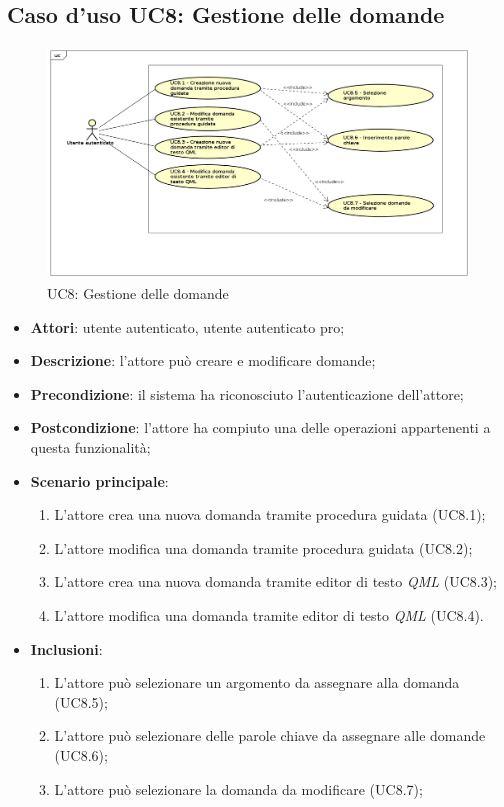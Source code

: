 \newpage
\subsection{Caso d'uso UC8: Gestione delle domande}
	\label{UC8}
	\begin{figure}[ht]
		\centering
			\includegraphics[scale=0.45,keepaspectratio]{UML/UC8.png}
		\caption{UC8: Gestione delle domande}
	\end{figure}
	\FloatBarrier
	\begin{itemize}
		\item
			\textbf{Attori}: utente autenticato, utente autenticato pro;
		\item		
			\textbf{Descrizione}: l'attore può creare e modificare domande;
		\item
			\textbf{Precondizione}: il sistema ha riconosciuto l'autenticazione dell'attore; 
		\item
			\textbf{Postcondizione}: l'attore ha compiuto una delle operazioni appartenenti a questa funzionalità;
		\item
			\textbf{Scenario principale}:
	       		\begin{enumerate}
					\item
					L'attore crea una nuova domanda tramite procedura guidata (UC8.1);
					\item
					L'attore modifica una domanda tramite procedura guidata (UC8.2);
					\item
					L'attore crea una nuova domanda tramite editor di testo \textit{QML} (UC8.3);
					\item
					L'attore modifica una domanda tramite editor di testo \textit{QML} (UC8.4).
	 			\end{enumerate}
		\item \textbf{Inclusioni}: 
			\begin{enumerate}
				\item L'attore può selezionare un argomento da assegnare alla domanda (UC8.5);
				\item L'attore può selezionare delle parole chiave da assegnare alle domande (UC8.6);								\item L'attore può selezionare la domanda da modificare (UC8.7);
			\end{enumerate}
	\end{itemize}
